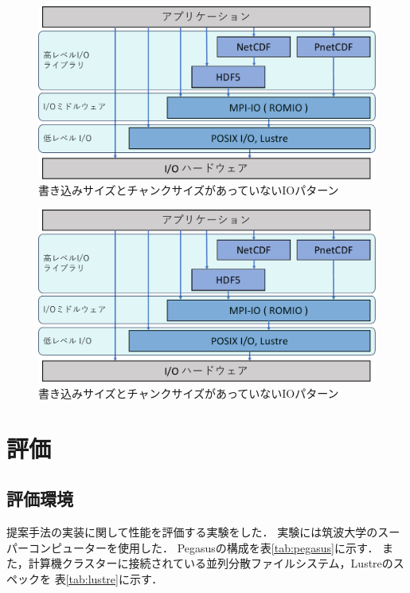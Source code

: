 \documentclass[submit,techrep,noauthor]{ipsj}
\begin{document}
\begin{figure}[t]
	\centering
	\includegraphics[page=14,width=\linewidth]{figure-crop.pdf}
	\caption{書き込みサイズとチャンクサイズがあっていないIOパターン}
	\label{fig:wrongio}
\end{figure}

\begin{figure}[t]
	\centering
	\includegraphics[page=15,width=\linewidth]{figure-crop.pdf}
	\caption{書き込みサイズとチャンクサイズがあっていないIOパターン}
	\label{fig:correctio}
\end{figure}

\section{評価}
\subsection{評価環境}
提案手法の実装に関して性能を評価する実験をした．
実験には筑波大学のスーパーコンピューター\cite{ccs2022pegasus}を使用した．
Pegasusの構成を表\ref{tab:pegasus}に示す．
また，計算機クラスターに接続されている並列分散ファイルシステム，Lustreのスペックを
表\ref{tab:lustre}に示す．
\end{document}
